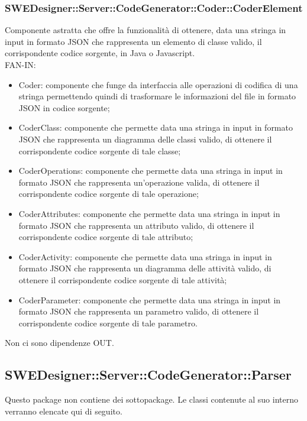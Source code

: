 \documentclass[../PianoDiQualifica.tex]{subfiles}
\begin{document}
		\subsubsection{SWEDesigner::Server::CodeGenerator::Coder::CoderElement}
		Componente astratta che offre la funzionalità di ottenere, data una stringa in input in formato JSON che rappresenta un elemento di classe valido, il corrispondente codice sorgente, in Java o Javascript.\\
		FAN-IN:
		\begin{itemize}
			\item Coder: componente che funge da interfaccia alle operazioni di codifica di una stringa permettendo quindi di trasformare le informazioni del file in formato JSON in codice sorgente;
			\item CoderClass: componente che permette data una stringa in input in formato JSON che rappresenta un diagramma delle classi valido, di ottenere il corrispondente codice sorgente di tale classe;
			\item CoderOperations: componente che permette data una stringa in input in formato JSON che rappresenta un'operazione valida, di ottenere il corrispondente codice sorgente di tale operazione;
			\item CoderAttributes: componente che permette data una stringa in input in formato JSON che rappresenta un attributo valido, di ottenere il corrispondente codice sorgente di tale attributo;
			\item CoderActivity: componente che permette data una stringa in input in formato JSON che rappresenta un diagramma delle attività valido, di ottenere il corrispondente codice sorgente di tale attività;
			\item CoderParameter: componente che permette data una stringa in input in formato JSON che rappresenta un parametro valido, di ottenere il corrispondente codice sorgente di tale parametro.
		\end{itemize}
		Non ci sono dipendenze OUT.
		\subsection{SWEDesigner::Server::CodeGenerator::Parser}
		Questo package non contiene dei sottopackage.
		Le classi contenute al suo interno verranno elencate qui di seguito.
\end{document}
